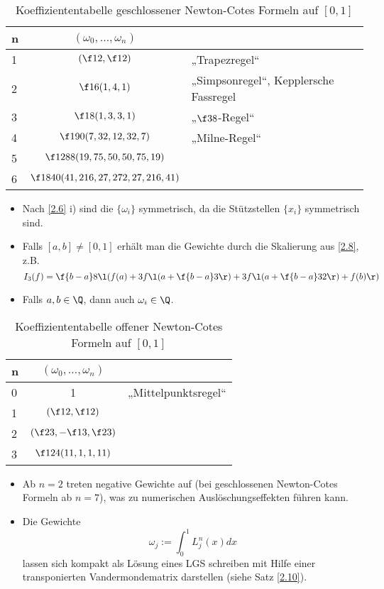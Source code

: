 \documentclass[11pt]{scrartcl}
\begin{document}
\begin{table}[!ht]
	\centering
	\caption{Koeffiziententabelle geschlossener Newton-Cotes Formeln auf $[0,1]$}
	\begin{tabular}{l|cl}
		n & $(\omega_0, \dotsc, \omega_n)$ \\ \hline
		1 & $(\f 12, \f 12)$ & „Trapezregel“ \\ 
		2 & $\f 16 (1,4,1)$ & „Simpsonregel“, Kepplersche Fassregel \\
		3 & $\f 18 (1,3,3,1)$ & „$\f 38$-Regel“ \\
		4 & $\f 1{90} (7,32,12,32,7)$ & „Milne-Regel“ \\
		5 & $\f 1{288} (19,75,50,50,75,19)$ & \\
		6 & $\f 1{840} (41,216,27,272,27,216,41)$ &
	\end{tabular}
\end{table}

\begin{nt*}
	\begin{itemize}
		\item
			Nach \ref{2.6} i) sind die $\{\omega_i\}$ symmetrisch, da die Stützstellen $\{x_i\}$ symmetrisch sind.
		\item
			Falls $[a,b] \neq [0,1]$ erhält man die Gewichte durch die Skalierung aus \ref{2.8}, z.B.
			\[
				I_3(f) = \f {b-a}8 \l( f(a) + 3 f\l(a+\f {b-a}3\r) + 3 f\l(a+\f {b-a}3 2\r) + f(b) \r)
			\]
		\item
			Falls $a,b\in \Q$, dann auch $\omega_i \in \Q$.
	\end{itemize}
\end{nt*}

\begin{table}[!ht]
	\centering
	\caption{Koeffiziententabelle offener Newton-Cotes Formeln auf $[0,1]$}
	\begin{tabular}{l|cl}
		n & $(\omega_0, \dotsc, \omega_n)$ \\ \hline
		0 & 1 & „Mittelpunktsregel“ \\ 
		1 & $(\f 12, \f 12)$ & \\
		2 & $(\f 23, -\f 13, \f 23)$ &  \\
		3 & $\f 1{24} (11,1,1,11)$ &
	\end{tabular}
\end{table}

\begin{nt*}
	\begin{itemize}
		\item
			Ab $n=2$ treten negative Gewichte auf (bei geschlossenen Newton-Cotes Formeln ab $n=7$), was zu numerischen Auslöschungseffekten führen kann.
		\item
			Die Gewichte
			\[
				\omega_j := \int_0^1 L_j^n(x) dx
			\]
			lassen sich kompakt als Lösung eines LGS schreiben mit Hilfe einer transponierten Vandermondematrix darstellen (siehe Satz \ref{2.10}).
	\end{itemize}
\end{nt*}
\end{document}
